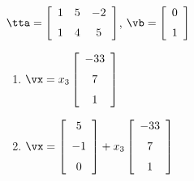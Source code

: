 {$\tta = \left[ \begin {array}{ccc} 1&5&-2\\\noalign{\medskip}1&4&5
\end {array} \right]$, $\vb=\left[ \begin {array}{c} 0\\\noalign{\medskip}1\end {array} \right]$}
{\begin{enumerate}
\item	 $\vx=x_3\left[ \begin {array}{c} -33\\\noalign{\medskip}7\\\noalign{\medskip}1\end {array}
\right]$
\item	 $\vx=\left[ \begin {array}{c} 5\\\noalign{\medskip}-1\\\noalign{\medskip}0\end {array} \right]+x_3\left[ \begin {array}{c} -33\\\noalign{\medskip}7\\\noalign{\medskip}1\end {array}
\right]$
\end{enumerate} 
 }


 

 


 

 






